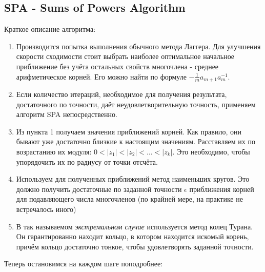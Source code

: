 \documentclass[a4paper,12pt]{article}
\begin{document}
\subsection{SPA - Sums of Powers Algorithm}
Краткое описание алгоритма:
\begin{enumerate}
    \item Производится попытка выполнения обычного метода Лаггера. Для улучшения скорости сходимости стоит выбрать наиболее оптимальное начальное приближение без учёта остальных свойств многочлена - среднее арифметическое корней. Его можно найти по формуле $-\frac{1}{m}a_{m+1}a_m^{-1}$.
    \item Если количество итераций, необходимое для получения результата, достаточного по точности, даёт неудовлетворительную точность, применяем алгоритм SPA непосредственно.
    \item Из пункта 1 получаем значения приближений корней. Как правило, они бывают уже достаточно близкие к настоящим значениям. Расставляем их по возрастанию их модуля: $0 < |z_1| < |z_2| < \dots < |z_k|$. Это необходимо, чтобы упорядочить их по радиусу от точки отсчёта.
    \item Используем для полученных приближений метод наименьших кругов. Это должно получить достаточные по заданной точности $\epsilon$ приближения корней для подавляющего числа многочленов (по крайней мере, на практике не встречалось иного)
    \item В так называемом \textit{экстремальном случае} используется метод колец Турана. Он гарантированно находит кольцо, в котором находится искомый корень, причём кольцо достаточно тонкое, чтобы удовлетворять заданной точности.
\end{enumerate}
Теперь остановимся на каждом шаге поподробнее:
\end{document}
